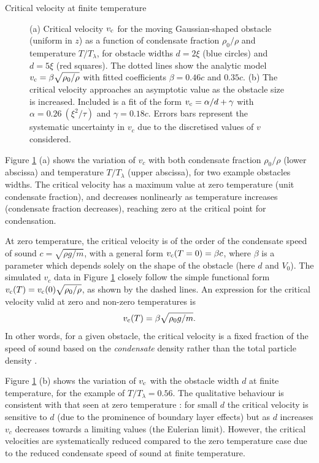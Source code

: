 \begin{chapter}{\label{cha:nonequib}Critical velocity at finite temperature}
\begin{figure}
\begin{center}
\end{center}
  \caption{\label{fig:vc-n0}(a) Critical velocity $v_{\rm c}$ for the moving Gaussian-shaped obstacle (uniform in $z$) as a function of condensate fraction $\rho_0/\rho$ and temperature $T/T_\lambda$, for obstacle widths $d=2\xi$ (blue circles) and $d=5\xi$ (red squares). The dotted lines show the analytic model $v_{\rm c}=\beta \sqrt{\rho_0/\rho}$ with fitted coefficients $\beta=0.46c$ and $0.35c$. (b) The critical velocity approaches an asymptotic value as the obstacle size is increased. Included is a fit of the form $v_{\rm c}=\alpha/d+\gamma$ with $\alpha=0.26~(\xi^2/\tau)$ and $\gamma=0.18 c$.  Errors bars represent the systematic uncertainty in $v_c$ due to the discretised values of $v$ considered.}
\end{figure}

Figure \ref{fig:vc-n0} (a) shows the variation of $v_c$ with both condensate fraction $\rho_0/\rho$ (lower abscissa) and temperature $T/T_\lambda$ (upper abscissa), for two example obstacles widths.  The critical velocity has a maximum value at zero temperature (unit condensate fraction), and decreases nonlinearly as temperature increases (condensate fraction decreases), reaching zero at the critical point for condensation.

At zero temperature, the critical velocity is of the order of the condensate speed of sound $c=\sqrt{\rho g/m}$, with a general form $v_{\rm c}(T=0)=\beta c$,
where $\beta$ is a parameter which depends solely on the shape of the
obstacle (here $d$ and $V_0$).  The simulated $v_c$ data in
Figure \ref{fig:vc-n0} closely follow the simple functional form
$v_{\rm c}(T) = v_{\rm c}(0) \sqrt{\rho_0/\rho}$, as shown by the dashed lines.
An expression for the critical velocity valid at zero and non-zero
temperatures is
\begin{equation}
v_{\rm c}(T)=\beta \sqrt{\rho_0 g/m}.
\label{eqn:finite_vc}
\end{equation}
In other words, for a given obstacle, the critical velocity is a fixed
fraction of the speed of sound based on the {\it condensate} density
rather than the total particle density \cite{leadbeater_2003}.

Figure \ref{fig:vc-n0} (b) shows the variation of $v_{\rm c}$ with the obstacle width $d$ at finite temperature, for the example of $T/T_\lambda =0.56$.   The qualitative behaviour is consistent with that seen at zero temperature \cite{huepe00,rica2001,stagg_parker_14}: for small $d$ the critical velocity is sensitive to $d$ (due to the prominence of boundary layer effects) but as $d$ increases $v_c$ decreases towards a limiting values (the Eulerian limit).  However, the critical velocities are systematically reduced compared to the zero temperature case due to the reduced condensate speed of sound at finite temperature.



\end{chapter}
